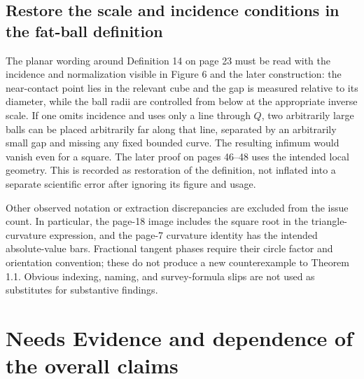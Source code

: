 \documentclass[10pt]{article}
\begin{document}
\subsection*{Restore the scale and incidence conditions in the fat-ball definition}
The planar wording around Definition 14 on page 23 must be read with the incidence and normalization visible in Figure 6 and the later construction: the near-contact point lies in the relevant cube and the gap is measured relative to its diameter, while the ball radii are controlled from below at the appropriate inverse scale. If one omits incidence and uses only a line through \(Q\), two arbitrarily large balls can be placed arbitrarily far along that line, separated by an arbitrarily small gap and missing any fixed bounded curve. The resulting infimum would vanish even for a square. The later proof on pages 46–48 uses the intended local geometry. This is recorded as restoration of the definition, not inflated into a separate scientific error after ignoring its figure and usage.\par
Other observed notation or extraction discrepancies are excluded from the issue count. In particular, the page-18 image includes the square root in the triangle-curvature expression, and the page-7 curvature identity has the intended absolute-value bars. Fractional tangent phases require their circle factor and orientation convention; these do not produce a new counterexample to Theorem 1.1. Obvious indexing, naming, and survey-formula slips are not used as substitutes for substantive findings.\par
\section*{Needs Evidence and dependence of the overall claims}
\end{document}
